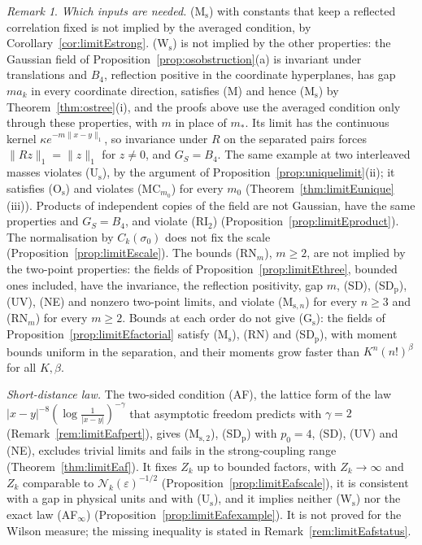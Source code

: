 \documentclass[aps,prd,twocolumn,superscriptaddress,nofootinbib,longbibliography,floatfix,amsmath,amssymb,10pt]{revtex4-2}
\theoremstyle{definition}
\theoremstyle{remark}
\newtheorem{remark}[theorem]{Remark}
\begin{document}
\begin{remark}
\emph{Which inputs are needed.} (M$_{\mathrm s}$) with constants that keep a
reflected correlation fixed is not implied by the averaged condition, by
Corollary~\ref{cor:limitEstrong}. (W$_{\mathrm s}$) is not implied by the
other properties: the Gaussian field of
Proposition~\ref{prop:osobstruction}(a) is invariant under translations and
$B_4$, reflection positive in the coordinate hyperplanes, has gap $ma_k$ in
every coordinate direction, satisfies (M) and hence (M$_{\mathrm s}$) by
Theorem~\ref{thm:ostree}(i), and the proofs above use the averaged condition
only through these properties, with $m$ in place of $m_*$. Its limit has
the continuous kernel $\kappa e^{-m\|x-y\|_1}$, so invariance under $R$ on
the separated pairs forces $\|Rz\|_1=\|z\|_1$ for $z\ne0$, and $G_S=B_4$.
The same example at two interleaved masses violates (U$_{\mathrm s}$), by
the argument of Proposition~\ref{prop:uniquelimit}(ii); it satisfies
(O$_{\mathrm s}$) and violates (MC$_{m_0}$) for every $m_0$
(Theorem~\ref{thm:limitEunique}(iii)). Products of independent copies of
the field are not Gaussian, have the same properties and $G_S=B_4$, and
violate (RI$_2$) (Proposition~\ref{prop:limitEproduct}). The normalisation
by $C_k(\sigma_0)$ does not fix the scale (Proposition~\ref{prop:limitEscale}).
The bounds (RN$_m$), $m\ge2$, are not implied by the two-point properties:
the fields of Proposition~\ref{prop:limitEthree}, bounded ones included, have
the invariance, the reflection positivity, gap $m$, (SD), (SD$_{\mathrm p}$),
(UV), (NE) and nonzero two-point limits, and violate (M$_{\mathrm s,n}$) for
every $n\ge3$ and (RN$_m$) for every $m\ge2$. Bounds at each order do not
give (G$_{\mathrm s}$): the fields of Proposition~\ref{prop:limitEfactorial}
satisfy (M$_{\mathrm s}$), (RN) and (SD$_{\mathrm p}$), with moment bounds
uniform in the separation, and their moments grow faster than
$K^n(n!)^\beta$ for all $K,\beta$.

\emph{Short-distance law.} The two-sided condition (AF), the lattice form of
the law $|x-y|^{-8}(\log\frac1{|x-y|})^{-\gamma}$ that asymptotic freedom
predicts with $\gamma=2$ (Remark~\ref{rem:limitEafpert}), gives
(M$_{\mathrm s,2}$), (SD$_{\mathrm p}$) with $p_0=4$, (SD), (UV) and (NE),
excludes trivial limits and fails in the strong-coupling range
(Theorem~\ref{thm:limitEaf}). It fixes $Z_k$ up to bounded factors, with
$Z_k\to\infty$ and $Z_k$ comparable to $\mathcal N_k(\varepsilon)^{-1/2}$
(Proposition~\ref{prop:limitEafscale}), it is consistent with a gap in
physical units and with (U$_{\mathrm s}$), and it implies neither
(W$_{\mathrm s}$) nor the exact law (AF$_\infty$)
(Proposition~\ref{prop:limitEafexample}). It is not proved for the Wilson
measure; the missing inequality is stated in
Remark~\ref{rem:limitEafstatus}.


\end{remark}
\end{document}
